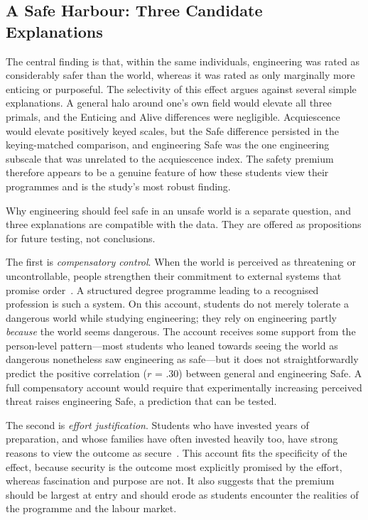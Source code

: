 \documentclass[journal,a4paper]{IEEEtran}
\begin{document}
\subsection{A Safe Harbour: Three Candidate Explanations}

The central finding is that, within the same individuals, engineering was rated as considerably safer than the world, whereas it was rated as only marginally more enticing or purposeful. The selectivity of this effect argues against several simple explanations. A general halo around one's own field would elevate all three primals, and the Enticing and Alive differences were negligible. Acquiescence would elevate positively keyed scales, but the Safe difference persisted in the keying-matched comparison, and engineering Safe was the one engineering subscale that was unrelated to the acquiescence index. The safety premium therefore appears to be a genuine feature of how these students view their programmes and is the study's most robust finding.

Why engineering should feel safe in an unsafe world is a separate question, and three explanations are compatible with the data. They are offered as propositions for future testing, not conclusions.

The first is \emph{compensatory control}. When the world is perceived as threatening or uncontrollable, people strengthen their commitment to external systems that promise order~\cite{kay2008,landau2015}. A structured degree programme leading to a recognised profession is such a system. On this account, students do not merely tolerate a dangerous world while studying engineering; they rely on engineering partly \emph{because} the world seems dangerous. The account receives some support from the person-level pattern—most students who leaned towards seeing the world as dangerous nonetheless saw engineering as safe—but it does not straightforwardly predict the positive correlation ($r$ = .30) between general and engineering Safe. A full compensatory account would require that experimentally increasing perceived threat raises engineering Safe, a prediction that can be tested.

The second is \emph{effort justification}. Students who have invested years of preparation, and whose families have often invested heavily too, have strong reasons to view the outcome as secure~\cite{aronson1959}. This account fits the specificity of the effect, because security is the outcome most explicitly promised by the effort, whereas fascination and purpose are not. It also suggests that the premium should be largest at entry and should erode as students encounter the realities of the programme and the labour market.
\end{document}
